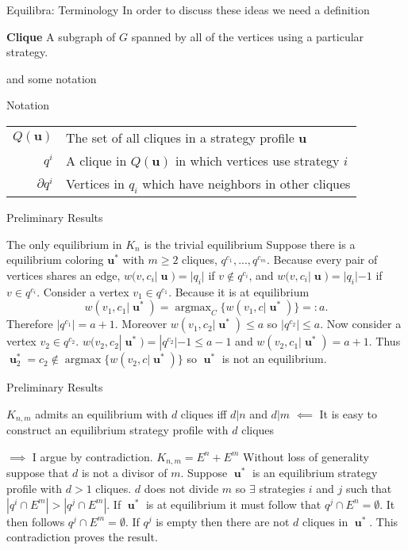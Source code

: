 \documentclass{beamer}
\DeclareMathOperator*{\argmax}{\text{argmax}}
\DeclareMathOperator{\uu}{\mathbf{u}}
\begin{document}
\begin{frame}
	{Equilibra: Terminology}
	In order to discuss these ideas we need a definition
	\begin{block}{\textbf{Clique}}
		A subgraph of $G$ spanned by all of the vertices using a particular strategy. 
	\end{block}  
	and some notation
	\begin{block}{Notation}
		\begin{tabular}{rp{9cm}} 
			$Q(\mathbf{u})$& The set of all cliques in a strategy profile $\mathbf{u}$ \\
			$q^i$& A clique in $Q(\mathbf{u})$ in which vertices use strategy $i$\\
			$\partial q^i$& Vertices in $q_i$ which have neighbors in other cliques\\
		\end{tabular}
	\end{block}
\end{frame} 	
\begin{frame}{Preliminary Results}
	\begin{block}{The only equilibrium in $K_n$ is the trivial equilibrium}
		Suppose there is a equilibrium coloring $\mathbf{u^*}$ with $m\geq2$ cliques, $q^{c_1},...,q^{c_m}$. Because every pair of vertices shares an edge, $w(v,c_i|\uu)=|q_i|$ if $v\notin q^{c_i}$, and $w(v,c_i|\uu)=|q_i|-1$ if $v\in q^{c_i}$.  Consider a vertex $v_1\in q^{c_1}$. Because it is at equilibrium $$w(v_1,c_1|\uu^*)=\argmax_C\{w(v_1,c|\uu^*)\}=:a.$$
		Therefore $|q^{c_1}|=a+1$. Moreover $w(v_1,c_2|\uu^*)\leq a$ so $|q^{c_2}|\leq a$.
		Now consider a vertex  $v_2\in q^{c_2}$. $w(v_2,c_2|\uu^*)=|q^{c_2}|-1\leq a-1$ and $w(v_2,c_1|\uu^*)=a+1$. 
		Thus $\uu^*_2=c_2\notin \argmax\{w(v_2,c|\uu^*)\}$ so $\uu^*$ is not an equilibrium.  
	\end{block}
\end{frame}

\begin{frame}{Preliminary Results}
	\begin{block}{$K_{n,m}$ admits an equilibrium with $d$ cliques iff $d|n$ and $d|m$}
		$\impliedby$ It is easy to construct an equilibrium strategy profile with $d$ cliques
		
		$\implies$ I argue by contradiction. $K_{n,m}=E^n+E^m$  Without loss of generality suppose that $d$ is not a divisor of $m$. Suppose $\uu^*$ is an equilibrium strategy profile with $d>1$ cliques. $d$ does not divide $m$ so $\exists$ strategies $i$ and $j$ such that $|q^i\cap E^m|>|q^j\cap E^m|$. If $\uu^*$ is at equilibrium it must follow that $q^j\cap E^n=\emptyset$. It then follows $q^j\cap E^m =\emptyset$. If $q^j$ is empty then there are not $d$ cliques in $\uu^*$. This contradiction proves the result.   
	\end{block}
\end{frame}
\end{document}
